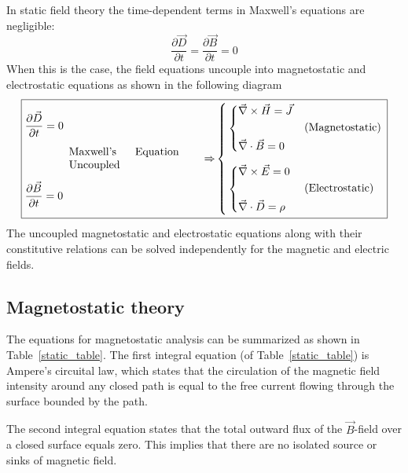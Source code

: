 \documentclass[12pt,a4paper,oneside]{book}
\begin{document}
\begin{onehalfspace}
In static field theory the time-dependent terms in Maxwell's equations are negligible:
\begin{equation}\label{static_1}
	\frac{\partial \vec{D}}{\partial t} = \frac{\partial \vec{B}}{\partial t} = 0
\end{equation} 
When this is the case, the field equations uncouple into magnetostatic and electrostatic equations as shown in the following diagram
\begin{equation}\label{static_2}
\boxed{\begin{aligned}
	&\frac{\partial \vec{D}}{\partial t} = 0 \\[6pt]		
	& \qquad \qquad \parbox{10em}{Maxwell's Equation Uncoupled} \qquad \Rightarrow \\[6pt]
	&\frac{\partial \vec{B}}{\partial t} = 0
\end{aligned}
\left\lbrace 
	\begin{aligned}
		&\left\lbrace 
		\begin{aligned}
			&\vec{\nabla}\times\vec{H}=\vec{J}\\
			&\qquad\qquad\qquad\text{(Magnetostatic)} \\
			&\vec{\nabla}\cdot\vec{B}=0
		\end{aligned}
		\right.\\[6pt]
		&\left\lbrace 
		\begin{aligned}
			&\vec{\nabla}\times\vec{E}=0\\
			&\qquad\qquad\qquad\text{(Electrostatic)} \\
			&\vec{\nabla}\cdot\vec{D}=\rho
		\end{aligned}
		\right.
	\end{aligned}
\right. }
\end{equation} 
The uncoupled magnetostatic and electrostatic equations along with their constitutive relations can be solved independently for the magnetic and electric fields.

\subsection{Magnetostatic theory}
The equations for magnetostatic analysis can be summarized as shown in Table~\ref{static_table}. The first integral equation (of Table~\ref{static_table}) is Ampere's circuital law, which states that the circulation of the magnetic field intensity around any closed path is equal to the free current flowing through the surface bounded by the path.

The second integral equation states that the total outward flux of the $\vec{B}$-field over a closed surface equals zero. This implies that there are no isolated source or sinks of magnetic field.


\end{onehalfspace}
\end{document}
